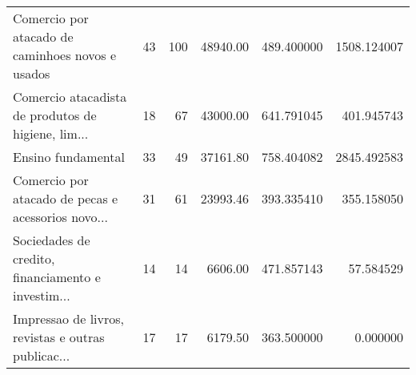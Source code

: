 \begin{tabular}{lrrrrr}
  Comercio por atacado de caminhoes novos e usados &                    43 &                  100 &     48940.00 &   489.400000 &               1508.124007 \\
Comercio atacadista de produtos de higiene, lim... &                    18 &                   67 &     43000.00 &   641.791045 &                401.945743 \\
                                Ensino fundamental &                    33 &                   49 &     37161.80 &   758.404082 &               2845.492583 \\
Comercio por atacado de pecas e acessorios novo... &                    31 &                   61 &     23993.46 &   393.335410 &                355.158050 \\
Sociedades de credito, financiamento e investim... &                    14 &                   14 &      6606.00 &   471.857143 &                 57.584529 \\
Impressao de livros, revistas e outras publicac... &                    17 &                   17 &      6179.50 &   363.500000 &                  0.000000 \\
\bottomrule
\end{tabular}
